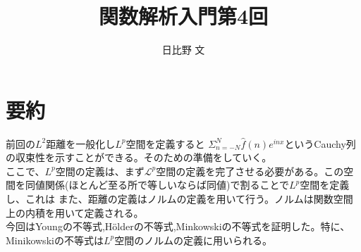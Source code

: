 \documentclass[12pt,a4paper]{ltjsarticle}
\begin{document}
\title{関数解析入門第4回}
\author{日比野 文}
\maketitle

\section{要約}
前回の$L^2$距離を一般化し$L^p$空間を定義すると
$\Sigma^N_{n=-N}\hat{f}(n)e^{inx}$というCauchy列の収束性を示すことができる。そのための準備をしていく。\\
ここで、$L^p$空間の定義は、まず$\mathcal{L}^p$空間の定義を完了させる必要がある。この空間を同値関係(ほとんど至る所で等しいならば同値)で割ることで$L^p$空間を定義し、これは
また、距離の定義はノルムの定義を用いて行う。ノルムは関数空間上の内積を用いて定義される。\\
今回はYoungの不等式,H\"olderの不等式,Minkowskiの不等式を証明した。特に、Minikowskiの不等式は$L^p$空間のノルムの定義に用いられる。\\
\end{document}

